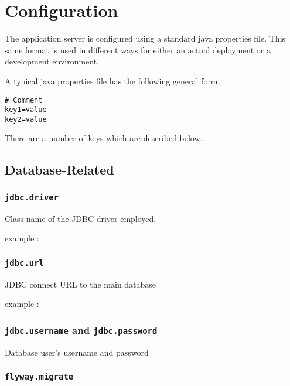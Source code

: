
\section{Configuration}
\label{config}

The application server is configured using a standard java properties file.  This same format is used in different ways for either an actual deployment or a development environment.

A typical java properties file has the following general form;

\begin{verbatim}
# Comment
key1=value
key2=value
\end{verbatim}

There are a number of keys which are described below.

\subsection{Database-Related}

\subsubsection{\tt jdbc.driver}

Class name of the JDBC driver employed.

example : 

\subsubsection{\tt jdbc.url}

JDBC connect URL to the main database

example : 

\subsubsection{{\tt jdbc.username} and {\tt jdbc.password}}

Database user's username and password

\subsubsection{\tt flyway.migrate}

